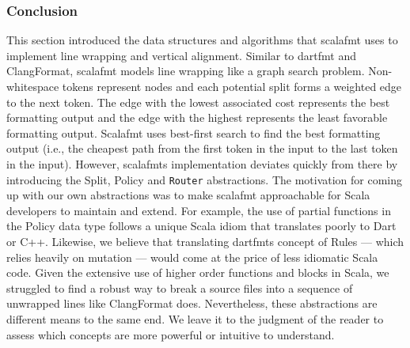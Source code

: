 %

\subsubsection{Conclusion}
This section introduced the data structures and algorithms that scalafmt uses to implement line wrapping and vertical alignment.
Similar to dartfmt and ClangFormat, scalafmt models line wrapping like a graph search problem.
Non-whitespace tokens represent nodes and each potential split forms a weighted edge to the next token.
The edge with the lowest associated cost represents the best formatting output and the edge with the highest represents the least favorable formatting output.
Scalafmt uses best-first search to find the best formatting output (i.e., the cheapest path from the first token in the input to the last token in the input).
However, scalafmts implementation deviates quickly from there by introducing the Split, Policy and \texttt{Router} abstractions.
The motivation for coming up with our own abstractions was to make scalafmt approachable for Scala developers to maintain and extend.
For example, the use of partial functions in the Policy data type follows a unique Scala idiom that translates poorly to Dart or C++.
Likewise, we believe that translating dartfmts concept of Rules --- which relies heavily on mutation --- would come at the price of less idiomatic Scala code.
Given the extensive use of higher order functions and blocks in Scala, we struggled to find a robust way to break a source files into a sequence of unwrapped lines like ClangFormat does.
Nevertheless, these abstractions are different means to the same end.
We leave it to the judgment of the reader to assess which concepts are more powerful or intuitive to understand.
